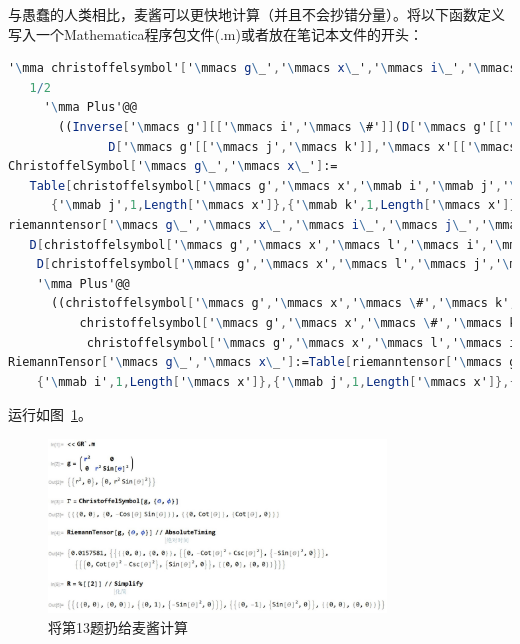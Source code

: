 \begin{xiti}
\begin{jie}
		与愚蠢的人类相比，麦酱可以更快地计算（并且不会抄错分量）。将以下函数定义写入一个Mathematica程序包文件(.m)或者放在笔记本文件的开头：
		\begin{lstlisting}[language=Mathematica]
'\mma christoffelsymbol'['\mmacs g\_','\mmacs x\_','\mmacs i\_','\mmacs j\_','\mmacs k\_']:=
   1/2
     '\mma Plus'@@
       ((Inverse['\mmacs g'][['\mmacs i','\mmacs \#']](D['\mmacs g'[['\mmacs \#','\mmacs j']],'\mmacs x'[['\mmacs k']]]+D['\mmacs g'[['\mmacs k','\mmacs \#']],'\mmacs x'[['\mmacs j']]]-
              D['\mmacs g'[['\mmacs j','\mmacs k']],'\mmacs x'[['\mmacs \#']]]))&)/@'\mma Range'[Length['\mmacs x']];
ChristoffelSymbol['\mmacs g\_','\mmacs x\_']:=
   Table[christoffelsymbol['\mmacs g','\mmacs x','\mmab i','\mmab j','\mmab k'],{'\mmab i',1,Length['\mmacs x']},
      {'\mmab j',1,Length['\mmacs x']},{'\mmab k',1,Length['\mmacs x']}];
riemanntensor['\mmacs g\_','\mmacs x\_','\mmacs i\_','\mmacs j\_','\mmacs k\_','\mmacs l\_']:=
   D[christoffelsymbol['\mmacs g','\mmacs x','\mmacs l','\mmacs i','\mmacs k'],'\mmacs x'[['\mmacs j']]]-
    D[christoffelsymbol['\mmacs g','\mmacs x','\mmacs l','\mmacs j','\mmacs k'],'\mmacs x'[['\mmacs i']]]+
    '\mma Plus'@@
      ((christoffelsymbol['\mmacs g','\mmacs x','\mmacs \#','\mmacs k','\mmacs i'] christoffelsymbol['\mmacs g','\mmacs x','\mmacs l','\mmacs j','\mmacs \#']-
          christoffelsymbol['\mmacs g','\mmacs x','\mmacs \#','\mmacs k','\mmacs j']
           christoffelsymbol['\mmacs g','\mmacs x','\mmacs l','\mmacs i','\mmacs \#'])&)/@Range[Length['\mmacs x']];
RiemannTensor['\mmacs g\_','\mmacs x\_']:=Table[riemanntensor['\mmacs g','\mmacs x','\mmab i','\mmab j','\mmab k','\mmab l'],
    {'\mmab i',1,Length['\mmacs x']},{'\mmab j',1,Length['\mmacs x']},{'\mmab k',1,Length['\mmacs x']},{'\mmab l',1,Length['\mmacs x']}];
		\end{lstlisting}
		运行如图~\ref{f3.1}。
		\begin{figure}[htb]
			\centering
			\includegraphics[width=0.8\textwidth]{1}
			\caption{将第13题扔给麦酱计算}\label{f3.1}
		\end{figure}
	\end{jie}
	

\end{xiti}
